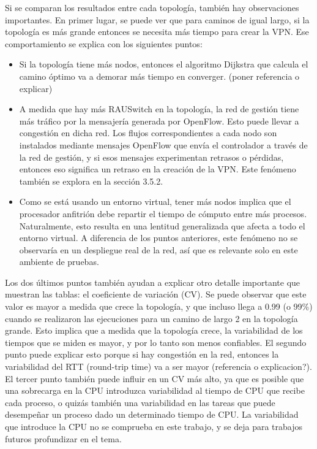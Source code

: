 Si se comparan los resultados entre cada topología, también hay observaciones importantes. En primer lugar, se puede ver que para caminos de igual largo, si la topología es más grande entonces se necesita más tiempo para crear la VPN. Ese comportamiento se explica con los siguientes puntos:
\begin{itemize}
	\item Si la topología tiene más nodos, entonces el algoritmo Dijkstra que calcula el camino óptimo va a demorar más tiempo en converger. (poner referencia o explicar)
	\item A medida que hay más RAUSwitch en la topología, la red de gestión tiene más tráfico por la mensajería generada por OpenFlow. Esto puede llevar a congestión en dicha red. Los flujos correspondientes a cada nodo son instalados mediante mensajes OpenFlow que envía el controlador a través de la red de gestión, y si esos mensajes experimentan retrasos o pérdidas, entonces eso significa un retraso en la creación de la VPN. Este fenómeno también se explora en la sección 3.5.2.
	\item Como se está usando un entorno virtual, tener más nodos implica que el procesador anfitrión debe repartir el tiempo de cómputo entre más procesos. Naturalmente, esto resulta en una lentitud generalizada que afecta a todo el entorno virtual. A diferencia de los puntos anteriores, este fenómeno no se observaría en un despliegue real de la red, así que es relevante solo en este ambiente de pruebas.
\end{itemize}
Los dos últimos puntos también ayudan a explicar otro detalle importante que muestran las tablas: el coeficiente de variación (CV). Se puede observar que este valor es mayor a medida que crece la topología, y que incluso llega a 0.99 (o 99\%) cuando se realizaron las ejecuciones para un camino de largo 2 en la topología grande. Esto implica que a medida que la topología crece, la variabilidad de los tiempos que se miden es mayor, y por lo tanto son menos confiables.
El segundo punto puede explicar esto porque si hay congestión en la red, entonces la variabilidad del RTT (round-trip time) va a ser mayor (referencia o explicacion?). El tercer punto también puede influir en un CV más alto, ya que es posible que una sobrecarga en la CPU introduzca variabilidad al tiempo de CPU que recibe cada proceso, o quizás también una variabilidad en las tareas que puede desempeñar un proceso dado un determinado tiempo de CPU. La variabilidad que introduce la CPU no se comprueba en este trabajo, y se deja para trabajos futuros profundizar en el tema.

